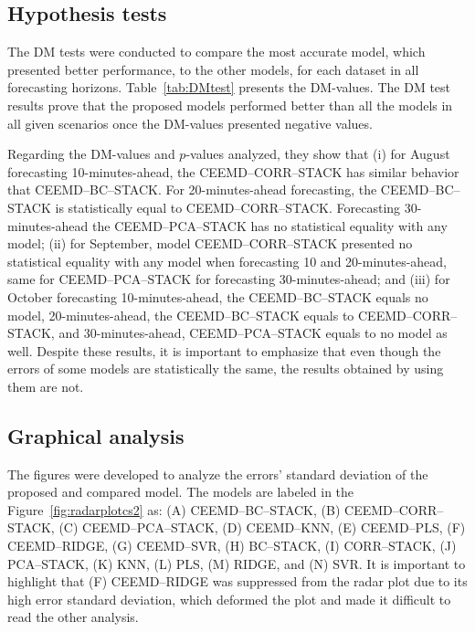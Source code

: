 \subsection{Hypothesis tests \label{subsec:stastistical}}

The \ac{DM} tests were conducted to compare the most accurate model, which presented better performance, to the other models, for each dataset in all forecasting horizons. Table~\ref{tab:DMtest} presents the DM-values. The \ac{DM} test results prove that the proposed models performed better than all the models in all given scenarios once the DM-values presented negative values.

% 

Regarding the DM-values and $p$-values analyzed, they show that (i) for August forecasting 10-minutes-ahead, the \ac{CEEMD}--\ac{CORR}--\ac{STACK} has similar behavior that \ac{CEEMD}--\ac{BC}--\ac{STACK}. For 20-minutes-ahead forecasting, the \ac{CEEMD}--\ac{BC}--\ac{STACK} is statistically equal to \ac{CEEMD}--\ac{CORR}--\ac{STACK}. Forecasting 30-minutes-ahead the \ac{CEEMD}--\ac{PCA}--\ac{STACK} has no statistical equality with any model; (ii) for September, model \ac{CEEMD}--\ac{CORR}--\ac{STACK} presented no statistical equality with any model when forecasting 10 and 20-minutes-ahead, same for \ac{CEEMD}--\ac{PCA}--\ac{STACK} for forecasting 30-minutes-ahead; and (iii) for October forecasting 10-minutes-ahead, the \ac{CEEMD}--\ac{BC}--\ac{STACK} equals no model, 20-minutes-ahead, the \ac{CEEMD}--\ac{BC}--\ac{STACK} equals to \ac{CEEMD}--\ac{CORR}--\ac{STACK}, and 30-minutes-ahead, \ac{CEEMD}--\ac{PCA}--\ac{STACK} equals to no model as well. Despite these results, it is important to emphasize that even though the errors of some models are statistically the same, the results obtained by using them are not.

\subsection{Graphical analysis \label{subsec:graphical}}

The figures were developed to analyze the errors' standard deviation of the proposed and compared model. The models are labeled in the Figure~\ref{fig:radarplotcs2} as: (A) \ac{CEEMD}--\ac{BC}--\ac{STACK}, (B) \ac{CEEMD}--\ac{CORR}--\ac{STACK}, (C) \ac{CEEMD}--\ac{PCA}--\ac{STACK}, (D) \ac{CEEMD}--\ac{KNN}, (E) \ac{CEEMD}--\ac{PLS}, (F) \ac{CEEMD}--\ac{RIDGE}, (G) \ac{CEEMD}--\ac{SVR}, (H) \ac{BC}--\ac{STACK}, (I) \ac{CORR}--\ac{STACK}, (J) \ac{PCA}--\ac{STACK}, (K) \ac{KNN}, (L) \ac{PLS}, (M) \ac{RIDGE}, and (N) \ac{SVR}. It is important to highlight that (F) \ac{CEEMD}--\ac{RIDGE} was suppressed from the radar plot due to its high error standard deviation, which deformed the plot and made it difficult to read the other analysis.


